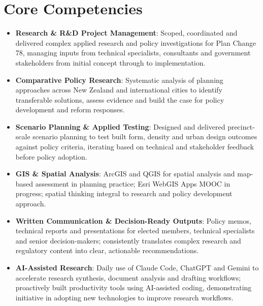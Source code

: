 \documentclass[11pt,a4paper,sans]{moderncv}
\begin{document}
\section{Core Competencies}
\vspace{1pt}
\begin{itemize}

\item \textbf{Research \& R\&D Project Management}: Scoped, coordinated and delivered complex applied research and policy investigations for Plan Change 78, managing inputs from technical specialists, consultants and government stakeholders from initial concept through to implementation.
\vspace{1pt}

\item \textbf{Comparative Policy Research}: Systematic analysis of planning approaches across New Zealand and international cities to identify transferable solutions, assess evidence and build the case for policy development and reform responses.
\vspace{1pt}

\item \textbf{Scenario Planning \& Applied Testing}: Designed and delivered precinct-scale scenario planning to test built form, density and urban design outcomes against policy criteria, iterating based on technical and stakeholder feedback before policy adoption.
\vspace{1pt}

\item \textbf{GIS \& Spatial Analysis}: ArcGIS and QGIS for spatial analysis and map-based assessment in planning practice; Esri WebGIS Apps MOOC in progress; spatial thinking integral to research and policy development approach.
\vspace{1pt}

\item \textbf{Written Communication \& Decision-Ready Outputs}: Policy memos, technical reports and presentations for elected members, technical specialists and senior decision-makers; consistently translates complex research and regulatory content into clear, actionable recommendations.
\vspace{1pt}

\item \textbf{AI-Assisted Research}: Daily use of Claude Code, ChatGPT and Gemini to accelerate research synthesis, document analysis and drafting workflows; proactively built productivity tools using AI-assisted coding, demonstrating initiative in adopting new technologies to improve research workflows.

\end{itemize}
\end{document}
